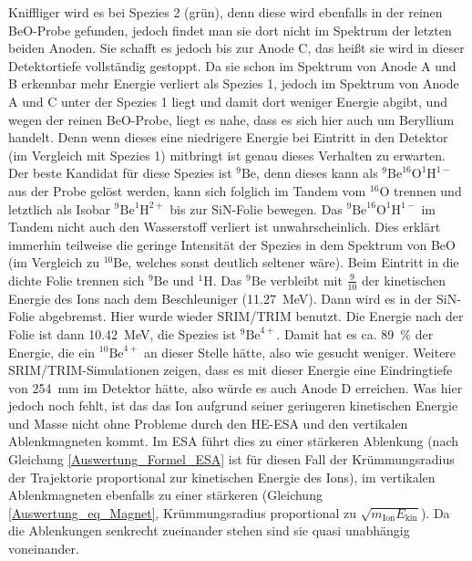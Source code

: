 Kniffliger wird es bei Spezies 2 (grün), denn diese wird ebenfalls in der reinen BeO-Probe gefunden, jedoch findet man sie dort nicht im Spektrum der letzten beiden Anoden.
Sie schafft es jedoch bis zur Anode C, das heißt sie wird in dieser Detektortiefe vollständig gestoppt.
Da sie schon im Spektrum von Anode A und B erkennbar mehr Energie verliert als Spezies 1, jedoch im Spektrum von Anode A und C unter der Spezies 1 liegt und damit dort weniger Energie abgibt, und wegen der reinen BeO-Probe, liegt es nahe, dass es sich hier auch um Beryllium handelt.
Denn wenn dieses eine niedrigere Energie bei Eintritt in den Detektor (im Vergleich mit Spezies 1) mitbringt ist genau dieses Verhalten zu erwarten.
Der beste Kandidat für diese Spezies ist $^{9}\text{Be}$, denn dieses kann als $^{9}\text{Be}^{16}\text{O}^{1}\text{H}^{1-}$ aus der Probe gelöst werden, kann sich folglich im Tandem vom $^{16}\text{O}$ trennen und letztlich als Isobar $^{9}\text{Be}^{1}\text{H}^{2+}$ bis zur SiN-Folie bewegen.
Das $^{9}\text{Be}^{16}\text{O}^{1}\text{H}^{1-}$ im Tandem nicht auch den Wasserstoff verliert ist unwahrscheinlich.
Dies erklärt immerhin teilweise die geringe Intensität der Spezies in dem Spektrum von BeO (im Vergleich zu $^{10}\text{Be}$, welches sonst deutlich seltener wäre).
Beim Eintritt in die dichte Folie trennen sich $^{9}\text{Be}$ und $^{1}\text{H}$.
Das $^{9}\text{Be}$ verbleibt mit $\frac{9}{10}$ der kinetischen Energie des Ions nach dem Beschleuniger (\SI{11.27}{\mega\electronvolt}).
Dann wird es in der SiN-Folie abgebremst.
Hier wurde wieder SRIM/TRIM benutzt.
Die Energie nach der Folie ist dann \SI{10.42}{\mega\electronvolt}, die Spezies ist $^{9}\text{Be}^{4+}$.
Damit hat es ca. \SI{89}{\percent} der Energie, die ein $^{10}\text{Be}^{4+}$ an dieser Stelle hätte, also wie gesucht weniger.
Weitere SRIM/TRIM-Simulationen zeigen, dass es mit dieser Energie eine Eindringtiefe von \SI{254}{\milli\metre} im Detektor hätte, also würde es auch Anode D erreichen.
Was hier jedoch noch fehlt, ist das das Ion aufgrund seiner geringeren kinetischen Energie und Masse nicht ohne Probleme durch den HE-ESA und den vertikalen Ablenkmagneten kommt.
Im ESA führt dies zu einer stärkeren Ablenkung (nach Gleichung \ref{Auswertung_Formel_ESA} ist für diesen Fall der Krümmungsradius der Trajektorie proportional zur kinetischen Energie des Ions), im vertikalen Ablenkmagneten ebenfalls zu einer stärkeren (Gleichung \ref{Auswertung_eq_Magnet}, Krümmungsradius proportional zu $\sqrt{m_{\text{Ion}}E_{\text{kin}}}$).
Da die Ablenkungen senkrecht zueinander stehen sind sie quasi unabhängig voneinander.

